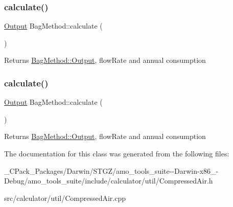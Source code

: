 \subsubsection{\texorpdfstring{calculate()}{calculate()}\hspace{0.1cm}{\footnotesize\ttfamily [2/3]}}
{\footnotesize\ttfamily \hyperlink{struct_bag_method_1_1_output}{Output} Bag\+Method\+::calculate (\begin{DoxyParamCaption}{ }\end{DoxyParamCaption})}

\begin{DoxyReturn}{Returns}
\hyperlink{struct_bag_method_1_1_output}{Bag\+Method\+::\+Output}, flow\+Rate and annual consumption 
\end{DoxyReturn}
\mbox{\label{class_bag_method_afe5b5d6bf23f8af18ad0c75edac1eb4d}} 
\subsubsection{\texorpdfstring{calculate()}{calculate()}\hspace{0.1cm}{\footnotesize\ttfamily [3/3]}}
{\footnotesize\ttfamily \hyperlink{struct_bag_method_1_1_output}{Output} Bag\+Method\+::calculate (\begin{DoxyParamCaption}{ }\end{DoxyParamCaption})}

\begin{DoxyReturn}{Returns}
\hyperlink{struct_bag_method_1_1_output}{Bag\+Method\+::\+Output}, flow\+Rate and annual consumption 
\end{DoxyReturn}


The documentation for this class was generated from the following files\+:\begin{DoxyCompactItemize}
\item 
\+\_\+\+C\+Pack\+\_\+\+Packages/\+Darwin/\+S\+T\+G\+Z/amo\+\_\+tools\+\_\+suite-\/-\/\+Darwin-\/x86\+\_-\/\+Debug/amo\+\_\+tools\+\_\+suite/include/calculator/util/Compressed\+Air.\+h\item 
src/calculator/util/Compressed\+Air.\+cpp\end{DoxyCompactItemize}
